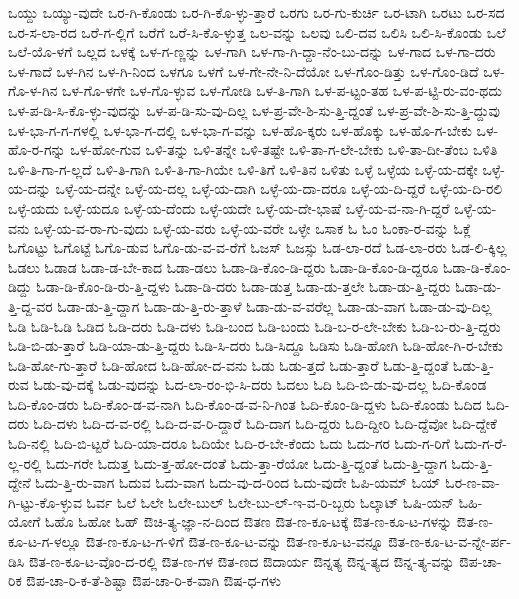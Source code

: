 {ಒಯ್ದು
ಒಯ್ಯು-ವುದೇ
ಒರ-ಗಿ-ಕೊಂಡು
ಒರ-ಗಿ-ಕೊ-ಳ್ಳು-ತ್ತಾರೆ
ಒರಗು
ಒರ-ಗು-ಕುರ್ಚಿ
ಒರ-ಟಾಗಿ
ಒರಟು
ಒರ-ಸದ
ಒರ-ಸ-ಲಾ-ರದ
ಒರೆ-ಗ-ಲ್ಲಿಗೆ
ಒರೆಗೆ
ಒರೆ-ಸಿ-ಕೊ-ಳ್ಳುತ್ತ
ಒಲ-ವನ್ನು
ಒಲವು
ಒಲಿ-ದವ
ಒಲಿಸಿ
ಒಲಿ-ಸಿ-ಕೊಂಡು
ಒಲೆ
ಒಲೆ-ಯೊ-ಳಗೆ
ಒಲ್ಲದ
ಒಳಕ್ಕೆ
ಒಳ-ಗ-ಣ್ಣನ್ನು
ಒಳ-ಗಾಗಿ
ಒಳ-ಗಾ-ಗಿ-ದ್ದಾ-ನೆಂ-ಬು-ದನ್ನು
ಒಳ-ಗಾದ
ಒಳ-ಗಾ-ದರು
ಒಳ-ಗಾದೆ
ಒಳ-ಗಿನ
ಒಳ-ಗಿ-ನಿಂದ
ಒಳಗೂ
ಒಳಗೆ
ಒಳ-ಗೇ-ನೇ-ನಿ-ದೆಯೋ
ಒಳ-ಗೊಂ-ಡಿತ್ತು
ಒಳ-ಗೊಂ-ಡಿದೆ
ಒಳ-ಗೊ-ಳ-ಗಿನ
ಒಳ-ಗೊ-ಳಗೇ
ಒಳ-ಗೊ-ಳ್ಳುವ
ಒಳ-ಗೋಡಿ
ಒಳ-ತಿ-ಗಾಗಿ
ಒಳ-ಪ-ಟ್ಟಂ-ತಹ
ಒಳ-ಪ-ಟ್ಟಿ-ರು-ವಂ-ಥದು
ಒಳ-ಪ-ಡಿ-ಸಿ-ಕೊ-ಳ್ಳು-ವುದನ್ನು
ಒಳ-ಪ-ಡಿ-ಸು-ವು-ದಿಲ್ಲ
ಒಳ-ಪ್ರ-ವೇ-ಶಿ-ಸು-ತ್ತಿ-ದ್ದಂತೆ
ಒಳ-ಪ್ರ-ವೇ-ಶಿ-ಸು-ತ್ತಿ-ದ್ದುವು
ಒಳ-ಭಾ-ಗ-ಗ-ಗಳಲ್ಲಿ
ಒಳ-ಭಾ-ಗ-ದಲ್ಲಿ
ಒಳ-ಭಾ-ಗ-ವನ್ನು
ಒಳ-ಹೊ-ಕ್ಕರು
ಒಳ-ಹೊಕ್ಕು
ಒಳ-ಹೊ-ಗ-ಬೇಕು
ಒಳ-ಹೊ-ರ-ಗನ್ನು
ಒಳ-ಹೋ-ಗುವ
ಒಳಿ-ತನ್ನು
ಒಳಿ-ತನ್ನೇ
ಒಳಿ-ತಷ್ಟೇ
ಒಳಿ-ತಾ-ಗ-ಲೇ-ಬೇಕು
ಒಳಿ-ತಾ-ದೀ-ತೆಂಬ
ಒಳಿತಿ
ಒಳಿ-ತಿ-ಗಾ-ಗ-ಲ್ಲದೆ
ಒಳಿ-ತಿ-ಗಾಗಿ
ಒಳಿ-ತಿ-ಗಾ-ಗಿಯೇ
ಒಳಿ-ತಿಗೆ
ಒಳಿ-ತಿನ
ಒಳಿತು
ಒಳ್ಳೆ
ಒಳ್ಳೆಯ
ಒಳ್ಳೆ-ಯ-ದಕ್ಕೇ
ಒಳ್ಳೆ-ಯ-ದನ್ನು
ಒಳ್ಳೆ-ಯ-ದನ್ನೇ
ಒಳ್ಳೆ-ಯ-ದಲ್ಲ
ಒಳ್ಳೆ-ಯ-ದಾಗಿ
ಒಳ್ಳೆ-ಯ-ದಾ-ದರೂ
ಒಳ್ಳೆ-ಯ-ದಿ-ದ್ದರೆ
ಒಳ್ಳೆ-ಯ-ದಿ-ರಲಿ
ಒಳ್ಳೆ-ಯದು
ಒಳ್ಳೆ-ಯದೂ
ಒಳ್ಳೆ-ಯ-ದೆಂದು
ಒಳ್ಳೆ-ಯದೇ
ಒಳ್ಳೆ-ಯ-ದೇ-ಭಾಷೆ
ಒಳ್ಳೆ-ಯ-ವ-ನಾ-ಗಿ-ದ್ದರೆ
ಒಳ್ಳೆ-ಯ-ವನು
ಒಳ್ಳೆ-ಯ-ವ-ರಾ-ಗು-ವುದು
ಒಳ್ಳೆ-ಯ-ವರು
ಒಳ್ಳೆ-ಯ-ವರೇ
ಒಳ್ಳೇ
ಒಸಾಕ
ಓ
ಓಂ
ಓಂಕಾ-ರ-ವನ್ನು
ಓಕ್ಲೆ
ಓಗೊಟ್ಟು
ಓಗೊಟ್ಟೆ
ಓಗೊ-ಡುವ
ಓಗೊ-ಡು-ವ-ವ-ರೆಗೆ
ಓಜಸ್
ಓಜಸ್ಸು
ಓಡ-ಲಾ-ರದೆ
ಓಡ-ಲಾ-ರರು
ಓಡ-ಲಿ-ಕ್ಕಿಲ್ಲ
ಓಡಲು
ಓಡಾಡ
ಓಡಾ-ಡ-ಬೇ-ಕಾದ
ಓಡಾ-ಡಲು
ಓಡಾ-ಡಿ-ಕೊಂ-ಡಿ-ದ್ದರು
ಓಡಾ-ಡಿ-ಕೊಂ-ಡಿ-ದ್ದರೂ
ಓಡಾ-ಡಿ-ಕೊಂ-ಡಿದ್ದು
ಓಡಾ-ಡಿ-ಕೊಂ-ಡಿ-ರು-ತ್ತಿ-ದ್ದಳು
ಓಡಾ-ಡಿ-ದರು
ಓಡಾ-ಡುತ್ತ
ಓಡಾ-ಡು-ತ್ತಲೇ
ಓಡಾ-ಡು-ತ್ತಿ-ದ್ದರು
ಓಡಾ-ಡು-ತ್ತಿ-ದ್ದ-ವರ
ಓಡಾ-ಡು-ತ್ತಿ-ದ್ದಾಗ
ಓಡಾ-ಡು-ತ್ತಿ-ರು-ತ್ತಾಳೆ
ಓಡಾ-ಡು-ವ-ವರೆಲ್ಲ
ಓಡಾ-ಡು-ವಾಗ
ಓಡಾ-ಡು-ವು-ದಿಲ್ಲ
ಓಡಿ
ಓಡಿ-ಓಡಿ
ಓಡಿದ
ಓಡಿ-ದರು
ಓಡಿ-ದಳು
ಓಡಿ-ಬಂದ
ಓಡಿ-ಬಂದು
ಓಡಿ-ಬ-ರ-ಲೇ-ಬೇಕು
ಓಡಿ-ಬ-ರು-ತ್ತಿ-ದ್ದರು
ಓಡಿ-ಬಿ-ಡು-ತ್ತಾರೆ
ಓಡಿ-ಯಾ-ಡು-ತ್ತಿ-ದ್ದರು
ಓಡಿ-ಸಿ-ದರು
ಓಡಿ-ಸಿದ್ದೂ
ಓಡಿಸು
ಓಡಿ-ಹೋಗಿ
ಓಡಿ-ಹೋ-ಗಿ-ರ-ಬೇಕು
ಓಡಿ-ಹೋ-ಗು-ತ್ತಾರೆ
ಓಡಿ-ಹೋದ
ಓಡಿ-ಹೋ-ದ-ವನು
ಓಡು
ಓಡು-ತ್ತದೆ
ಓಡು-ತ್ತಾರೆ
ಓಡು-ತ್ತಿ-ದ್ದಂತೆ
ಓಡು-ತ್ತಿ-ರುವ
ಓಡು-ವು-ದಕ್ಕೆ
ಓಡು-ವುದನ್ನು
ಓದ-ಲಾ-ರಂ-ಭಿ-ಸಿ-ದರು
ಓದಲು
ಓದಿ
ಓದಿ-ಬಿ-ಡು-ವು-ದಲ್ಲ
ಓದಿ-ಕೊಂಡ
ಓದಿ-ಕೊಂ-ಡರು
ಓದಿ-ಕೊಂ-ಡ-ವ-ನಾಗಿ
ಓದಿ-ಕೊಂ-ಡ-ವ-ನಿ-ಗಿಂತ
ಓದಿ-ಕೊಂ-ಡಿ-ದ್ದಳು
ಓದಿ-ಕೊಂಡು
ಓದಿದ
ಓದಿ-ದರು
ಓದಿ-ದಳು
ಓದಿ-ದ-ವ-ರಲ್ಲಿ
ಓದಿ-ದ-ವ-ರಿ-ದ್ದಾರೆ
ಓದಿ-ದಾಗ
ಓದಿ-ದ್ದರು
ಓದಿ-ದ್ದೀರಿ
ಓದಿ-ದ್ದೆವೋ
ಓದಿ-ದ್ದೇಕೆ
ಓದಿ-ನಲ್ಲಿ
ಓದಿ-ಬಿ-ಟ್ಟರೆ
ಓದಿ-ಯಾ-ದರೂ
ಓದಿಯೇ
ಓದಿ-ರ-ಬೇ-ಕೆಂದು
ಓದು
ಓದು-ಗರ
ಓದು-ಗ-ರಿಗೆ
ಓದು-ಗ-ರೆ-ಲ್ಲ-ರಲ್ಲಿ
ಓದು-ಗರೇ
ಓದುತ್ತ
ಓದು-ತ್ತ-ಹೋ-ದಂತೆ
ಓದು-ತ್ತಾ-ರೆಯೋ
ಓದು-ತ್ತಿ-ದ್ದಂತೆ
ಓದು-ತ್ತಿ-ದ್ದಾಗ
ಓದು-ತ್ತಿ-ದ್ದೇನೆ
ಓದು-ತ್ತಿ-ರು-ವಾಗ
ಓದುವ
ಓದು-ವಾಗ
ಓದು-ವು-ದ-ರಿಂದ
ಓದು-ವುದೇ
ಓಪಿ-ಯಮ್
ಓಯ್
ಓರ-ಣ-ವಾ-ಗಿ-ಟ್ಟು-ಕೊ-ಳ್ಳುವ
ಓರ್ವ
ಓಲೆ
ಓಲೇ
ಓಲೇ-ಬುಲ್
ಓಲೇ-ಬು-ಲ್-ಇ-ವ-ರಿ-ಬ್ಬರು
ಓಲ್ಕಾಟ್
ಓಷಿ-ಯನ್
ಓಹಿ-ಯೋಗೆ
ಓಹೊ
ಓಹೋ
ಓಹ್
ಔಚಿ-ತ್ಯ-ಜ್ಞಾ-ನ-ದಿಂದ
ಔತಣ
ಔತ-ಣ-ಕೂ-ಟಕ್ಕೆ
ಔತ-ಣ-ಕೂ-ಟ-ಗಳನ್ನು
ಔತ-ಣ-ಕೂ-ಟ-ಗ-ಳಲ್ಲೂ
ಔತ-ಣ-ಕೂ-ಟ-ಗ-ಳಿಗೆ
ಔತ-ಣ-ಕೂ-ಟ-ವನ್ನು
ಔತ-ಣ-ಕೂ-ಟ-ವನ್ನೂ
ಔತ-ಣ-ಕೂ-ಟ-ವ-ನ್ನೇ-ರ್ಪ-ಡಿಸಿ
ಔತ-ಣ-ಕೂ-ಟ-ವೊಂ-ದ-ರಲ್ಲಿ
ಔತ-ಣ-ಗಳ
ಔತ-ಣದ
ಔದಾರ್ಯ
ಔನ್ನತ್ಯ
ಔನ್ನ-ತ್ಯದ
ಔನ್ನ-ತ್ಯ-ವನ್ನು
ಔಪ-ಚಾ-ರಿಕ
ಔಪ-ಚಾ-ರಿ-ಕ-ತೆ-ಶಿಷ್ಟಾ
ಔಪ-ಚಾ-ರಿ-ಕ-ವಾಗಿ
ಔಷ-ಧ-ಗಳು
}
